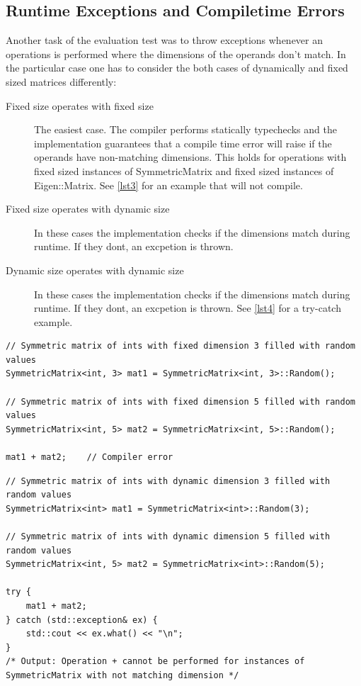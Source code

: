 \documentclass[a4wide]{scrartcl}
\begin{document}
\subsection{Runtime Exceptions and Compiletime Errors}
Another task of the evaluation test was to throw exceptions whenever an operations is performed where the dimensions of the operands don't match. In the particular case one has to consider the both cases of dynamically and fixed sized matrices differently:\newline
\begin{description}
\item[Fixed size operates with fixed size] The easiest case. The compiler performs statically typechecks and the implementation guarantees that a compile time error will raise if the operands have non-matching dimensions. This holds for operations with fixed sized instances of SymmetricMatrix and fixed sized instances of Eigen::Matrix. See \autoref{lst3} for an example that will not compile.
\item[Fixed size operates with dynamic size] In these cases the implementation checks if the dimensions match during runtime. If they dont, an excpetion is thrown.
\item[Dynamic size operates with dynamic size] In these cases the implementation checks if the dimensions match during runtime. If they dont, an excpetion is thrown. See \autoref{lst4} for a try-catch example.
\end{description}
\begin{table}
\begin{lstlisting}[caption={Addition of matrices with different fixed size. This example will not compile.},label=lst3]
// Symmetric matrix of ints with fixed dimension 3 filled with random values
SymmetricMatrix<int, 3> mat1 = SymmetricMatrix<int, 3>::Random();

// Symmetric matrix of ints with fixed dimension 5 filled with random values
SymmetricMatrix<int, 5> mat2 = SymmetricMatrix<int, 5>::Random();

mat1 + mat2;    // Compiler error
\end{lstlisting}
\end{table}
\begin{table}
\begin{lstlisting}[caption={Addition of matrices with different dynamic size.},label=lst4]
// Symmetric matrix of ints with dynamic dimension 3 filled with random values
SymmetricMatrix<int> mat1 = SymmetricMatrix<int>::Random(3);

// Symmetric matrix of ints with dynamic dimension 5 filled with random values
SymmetricMatrix<int, 5> mat2 = SymmetricMatrix<int>::Random(5);

try {
    mat1 + mat2;
} catch (std::exception& ex) {
    std::cout << ex.what() << "\n";     
}
/* Output: Operation + cannot be performed for instances of SymmetricMatrix with not matching dimension */
\end{lstlisting}
\end{table}
\end{document}
